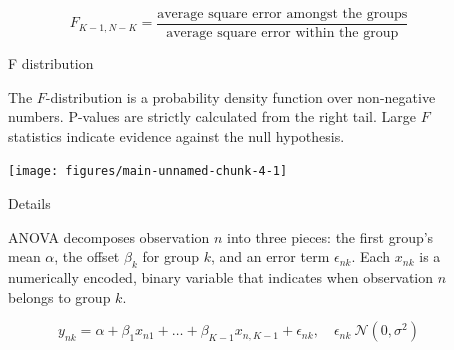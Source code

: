 \documentclass[final,9pt,fleqn]{beamer}\usepackage[]{graphicx}\usepackage[]{color}
\newenvironment{knitrout}{}{} %
\begin{document}
\begin{frame}[fragile]
\begin{columns}
\begin{column}{0.3\paperwidth}
\begin{knitrout}
\end{knitrout}
\vspace{-0.2in}

\begin{centering}
\[ F_{K-1, N-K} = \frac{\text{average square error amongst the groups}}{\text{average square error within the group}} \]
\end{centering}



\begin{block}{{\huge F distribution}}

  The $F$-distribution is a probability density function over non-negative numbers.  P-values are strictly calculated from the right tail.  Large $F$ statistics indicate evidence against the null hypothesis.

\begin{knitrout}
\color{fgcolor}

{\centering \texttt{[image: figures/main-unnamed-chunk-4-1]} 

}



\end{knitrout}
\end{block}

\vspace{-0.2in}

\begin{block}{{\huge Details}}

  ANOVA decomposes observation $n$ into three pieces: the first group's mean $\alpha$, the offset $\beta_k$ for group $k$, and an error term $\epsilon_{nk}$.  Each $x_{nk}$ is a numerically encoded, binary variable that indicates when observation $n$ belongs to group $k$.
  \vspace{-0.15in}

  \[ y_{nk} = \alpha + \beta_1  x_{n1} + \ldots + \beta_{K-1} x_{n,K-1} + \epsilon_{nk}, \quad \epsilon_{nk} ~ \mathcal{N}(0, \sigma^2)\]
\end{block}

\end{column}

\begin{column}{0.03\paperwidth}
\end{column}

\begin{column}{0.25\paperwidth}


\end{column}
\end{columns}
\end{frame}
\end{document}
